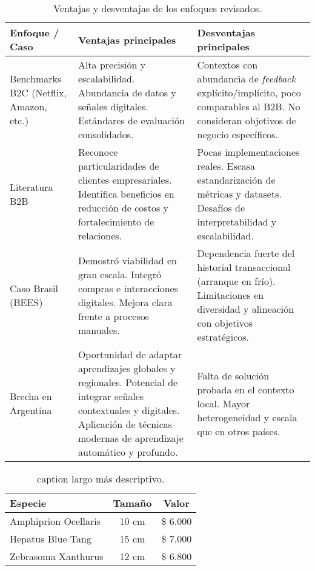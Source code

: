 \begin{table}[H]
\centering
\caption[Ventajas y desventajas de enfoques en recomendación]{Ventajas y desventajas de los enfoques revisados.}
\label{tab:estado_arte}
\begin{tabularx}{\textwidth}{>{\hsize=0.5\hsize}X >{\hsize=1.25\hsize}X >{\hsize=1.25\hsize}X}
\toprule
\textbf{Enfoque / Caso} & \textbf{Ventajas principales} & \textbf{Desventajas principales} \\
\midrule
Benchmarks B2C (Netflix, Amazon, etc.) &
Alta precisión y escalabilidad. Abundancia de datos y señales digitales. Estándares de evaluación consolidados. &
Contextos con abundancia de \textit{feedback} explícito/implícito, poco comparables al B2B. No consideran objetivos de negocio específicos. \\
Literatura B2B &
Reconoce particularidades de clientes empresariales. Identifica beneficios en reducción de costos y fortalecimiento de relaciones. &
Pocas implementaciones reales. Escasa estandarización de métricas y datasets. Desafíos de interpretabilidad y escalabilidad. \\
Caso Brasil (BEES) &
Demostró viabilidad en gran escala. Integró compras e interacciones digitales. Mejora clara frente a procesos manuales. &
Dependencia fuerte del historial transaccional (arranque en frío). Limitaciones en diversidad y alineación con objetivos estratégicos. \\
Brecha en Argentina &
Oportunidad de adaptar aprendizajes globales y regionales. Potencial de integrar señales contextuales y digitales. Aplicación de técnicas modernas de aprendizaje automático y profundo. &
Falta de solución probada en el contexto local. Mayor heterogeneidad y escala que en otros países. \\
\bottomrule
\end{tabularx}
\end{table}

\begin{table}[h]
	\centering
	\caption[caption corto]{caption largo más descriptivo.}
	\begin{tabular}{l c c}    
		\toprule
		\textbf{Especie} 	 & \textbf{Tamaño} 		& \textbf{Valor}  \\
		\midrule
		Amphiprion Ocellaris & 10 cm 				& \$ 6.000 \\		
		Hepatus Blue Tang	 & 15 cm				& \$ 7.000 \\
		Zebrasoma Xanthurus	 & 12 cm				& \$ 6.800 \\
		\bottomrule
		\hline
	\end{tabular}
	\label{tab:peces}
\end{table}

